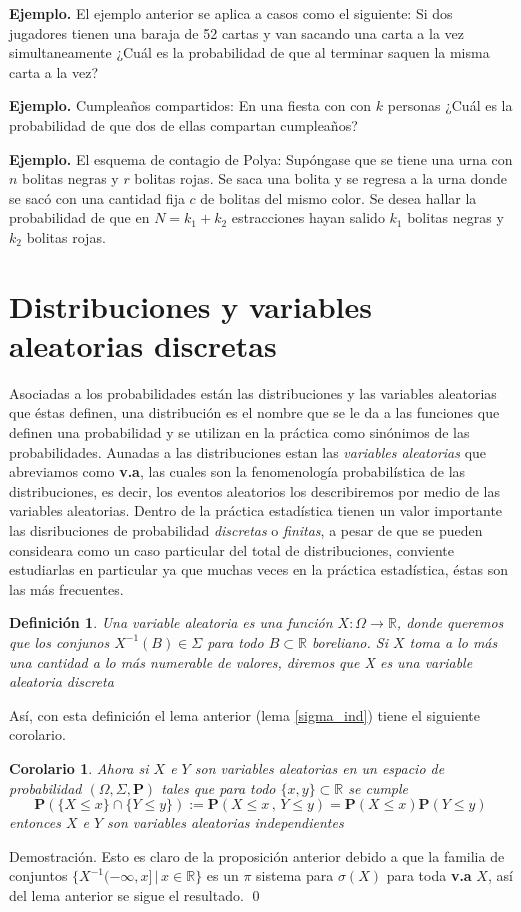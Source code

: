 \documentclass[letterpaper]{book}
\newtheorem{cor}[teorema]{Corolario}
\newtheorem{def.}{Definici\'on}[section]
\newcommand{\prob}{\textbf{P}}
\newcommand{\exe}{{\newline \noindent \sc \textbf{Ejemplo. }}}
\newcommand{\dem}{{\noindent \sc Demostraci\'on. }}
\newcommand{\om}{\ensuremath{\Omega}}
\newcommand{\sig}{\ensuremath{\Sigma}}
\newcommand{\re}{\ensuremath{\mathbb R }}
\begin{document}
\exe El ejemplo anterior se aplica a casos como el siguiente: Si dos jugadores tienen una baraja de 52 cartas y van sacando una carta a la vez simultaneamente ¿Cuál es la probabilidad de que al terminar saquen la misma carta a la vez?

\exe Cumpleaños compartidos: En una fiesta con con \(k\) personas ¿Cuál es la probabilidad de que dos de ellas compartan cumpleaños? 

\exe El esquema de contagio de Polya: Supóngase que se tiene una urna con \(n\) bolitas negras y \(r\) bolitas rojas. Se saca una bolita y se regresa a la urna donde se sacó con una cantidad fija \(c\) de bolitas del mismo color. Se desea hallar la probabilidad de que en \(N=k_1+k_2\) estracciones hayan salido \(k_1\) bolitas negras y \(k_2\) bolitas rojas.

\section{Distribuciones y variables aleatorias discretas}
\label{sec:org0d41fee}

\noindent Asociadas a los probabilidades están las distribuciones y las variables aleatorias que éstas definen, una distribución es el nombre que se le da a las funciones que definen una probabilidad y se utilizan en la práctica como sinónimos de las probabilidades. Aunadas a las distribuciones estan las \emph{variables aleatorias} que abreviamos como \textbf{v.a}, las cuales son la fenomenología probabilística de las distribuciones, es decir, los eventos aleatorios los describiremos por medio de las variables aleatorias. Dentro de la práctica estadística tienen un valor importante las disribuciones de probabilidad \emph{discretas} o \emph{finitas}, a pesar de que se pueden consideara como un caso particular del total de distribuciones, conviente estudiarlas en particular ya que muchas veces en la práctica estadística, éstas son las más frecuentes. 

\begin{def.}
Una variable aleatoria es una función \(X:\om\rightarrow\re\), donde queremos que los conjunos \(X^{-1}(B)\in\sig\) para todo \(B\subset\re\) boreliano. Si \(X\) toma a lo más una cantidad a lo más numerable de valores, diremos que X es una variable aleatoria \emph{discreta}
\end{def.}

Así, con esta definición el lema anterior (lema \ref{sigma_ind}) tiene el siguiente corolario.

\begin{cor}
Ahora si $X$ e $Y$ son variables aleatorias en un espacio de probabilidad $(\om,\sig,\prob)$ tales que para todo $\{x,y\}\subset\re$ se cumple
\[
    \prob(\{X\leq x\}\cap\{Y\leq y\}):=\prob(X\leq x\,,\, Y\leq y)=\prob(X\leq x)\prob(Y\leq y)
\]
entonces $X$ e $Y$ son variables aleatorias independientes
\end{cor}
\dem
Esto es claro de la proposición anterior debido a que la familia de conjuntos \(\{X^{-1}(-\infty,x]\,\vert\,x\in\re\}\) es un \(\pi\) sistema para \(\sigma(X)\) para toda \textbf{v.a} \(X\), así del lema anterior se sigue el resultado.
\qed\\
\end{document}

